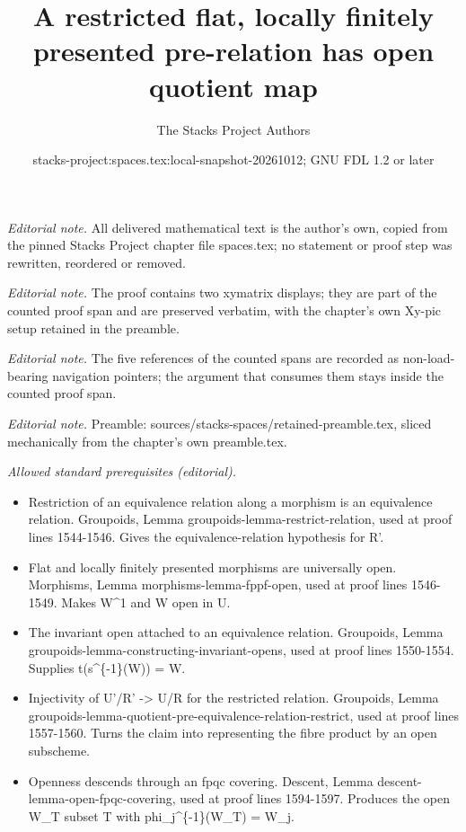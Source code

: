 \documentclass[10pt,a4paper]{amsart}
\title{A restricted flat, locally finitely presented pre-relation has open quotient map}
\author{The Stacks Project Authors}
\date{stacks-project:spaces.tex:local-snapshot-20261012; GNU FDL 1.2 or later}
\theoremstyle{plain}
\theoremstyle{definition}
\theoremstyle{remark}
\numberwithin{equation}{subsection}
\begin{document}
\maketitle
\setcounter{subsection}{1}
\noindent\textit{Editorial note.} All delivered mathematical text is the author's own, copied from the pinned Stacks Project chapter file spaces.tex; no statement or proof step was rewritten, reordered or removed.\par\medskip
\noindent\textit{Editorial note.} The proof contains two xymatrix displays; they are part of the counted proof span and are preserved verbatim, with the chapter's own Xy-pic setup retained in the preamble.\par\medskip
\noindent\textit{Editorial note.} The five references of the counted spans are recorded as non-load-bearing navigation pointers; the argument that consumes them stays inside the counted proof span.\par\medskip
\noindent\textit{Editorial note.} Preamble: sources/stacks-spaces/retained-preamble.tex, sliced mechanically from the chapter's own preamble.tex.\par\medskip
\noindent\textit{Allowed standard prerequisites (editorial).}\begin{itemize}
\item Restriction of an equivalence relation along a morphism is an equivalence relation. Groupoids, Lemma groupoids-lemma-restrict-relation, used at proof lines 1544-1546. Gives the equivalence-relation hypothesis for R'.
\item Flat and locally finitely presented morphisms are universally open. Morphisms, Lemma morphisms-lemma-fppf-open, used at proof lines 1546-1549. Makes W\textasciicircum{}1 and W open in U.
\item The invariant open attached to an equivalence relation. Groupoids, Lemma groupoids-lemma-constructing-invariant-opens, used at proof lines 1550-1554. Supplies t(s\textasciicircum{}\{-1\}(W)) = W.
\item Injectivity of U'/R' -> U/R for the restricted relation. Groupoids, Lemma groupoids-lemma-quotient-pre-equivalence-relation-restrict, used at proof lines 1557-1560. Turns the claim into representing the fibre product by an open subscheme.
\item Openness descends through an fpqc covering. Descent, Lemma descent-lemma-open-fpqc-covering, used at proof lines 1594-1597. Produces the open W\_T subset T with phi\_j\textasciicircum{}\{-1\}(W\_T) = W\_j.
\end{itemize}\medskip
\end{document}

